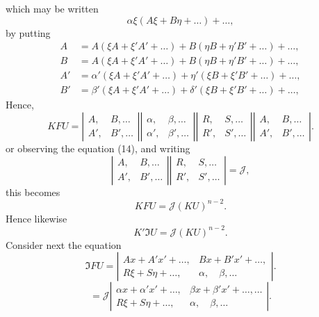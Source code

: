 \documentclass[11pt,a4paper]{book}
\begin{document}
which may be written
\[
\alpha\xi(A\xi + B\eta + \ldots) + \ldots
\tag{16},
\]
\newpage
by putting
\begin{align*}
A &= A(\xi A + \xi' A' + \ldots) + B(\eta B + \eta' B' + \ldots) + \ldots, \\
B &= A(\xi A + \xi' A' + \ldots) + B(\eta B + \eta' B' + \ldots) + \ldots, \\
A' &= \alpha'(\xi A + \xi' A' + \ldots) + \eta'(\xi B + \xi' B' + \ldots) + \ldots, \\
B' &= \beta'(\xi A + \xi' A' + \ldots) + \delta'(\xi B + \xi' B' + \ldots) + \ldots,
\end{align*}
Hence,
\[
KFU = \left|\begin{array}{cc}
A, & B, \ldots \\
A', & B', \ldots
\end{array}\right|
\left|\begin{array}{cc}
\alpha, & \beta, \ldots \\
\alpha', & \beta', \ldots
\end{array}\right|
\left|\begin{array}{cc}
R, & S, \ldots \\
R', & S', \ldots
\end{array}\right|
\left|\begin{array}{cc}
A, & B, \ldots \\
A', & B', \ldots
\end{array}\right|
\tag{17}.
\]
or observing the equation (14), and writing
\[
\left|\begin{array}{cc}
A, & B, \ldots \\
A', & B', \ldots
\end{array}\right|
\left|\begin{array}{cc}
R, & S, \ldots \\
R', & S', \ldots
\end{array}\right| = \mathcal{J}
\tag{18},
\]
this becomes
\[
KFU = \mathcal{J}(KU)^{n-2}
\tag{19}.
\]
Hence likewise
\[
K'\mathfrak{I}U = \mathcal{J}(KU)^{n-2}
\tag{20}.
\]
Consider next the equation
\[
\mathfrak{I}FU =
\left|\begin{array}{cc}
Ax + A'x' + \ldots, & Bx + B'x' + \ldots, \\
R\xi + S\eta + \ldots, & \alpha, \quad \beta, \ldots
\end{array}\right|
\tag{21}.
\]
\[
= \mathcal{J}
\left|\begin{array}{cc}
\alpha x + \alpha'x' + \ldots, & \beta x + \beta'x' + \ldots, \ldots \\
R\xi + S\eta + \ldots, & \alpha, \quad \beta, \ldots
\end{array}\right|
\tag{22}.
\]
\end{document}
